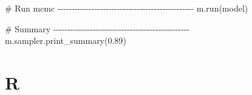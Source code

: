 \documentclass[
  letterpaper,
  DIV=11,
  numbers=noendperiod]{scrreprt}
\newenvironment{Shaded}{\begin{snugshade}}{\end{snugshade}}
\newcommand{\AttributeTok}[1]{\textcolor[rgb]{0.40,0.45,0.13}{#1}}
\newcommand{\CommentTok}[1]{\textcolor[rgb]{0.37,0.37,0.37}{#1}}
\newcommand{\FloatTok}[1]{\textcolor[rgb]{0.68,0.00,0.00}{#1}}
\newcommand{\FunctionTok}[1]{\textcolor[rgb]{0.28,0.35,0.67}{#1}}
\newcommand{\NormalTok}[1]{\textcolor[rgb]{0.00,0.23,0.31}{#1}}
\newcommand{\OtherTok}[1]{\textcolor[rgb]{0.00,0.23,0.31}{#1}}
\newcommand{\SpecialCharTok}[1]{\textcolor[rgb]{0.37,0.37,0.37}{#1}}
\newcommand{\StringTok}[1]{\textcolor[rgb]{0.13,0.47,0.30}{#1}}
\begin{document}
\begin{Shaded}
\begin{Highlighting}[]
\CommentTok{\# Run mcmc {-}{-}{-}{-}{-}{-}{-}{-}{-}{-}{-}{-}{-}{-}{-}{-}{-}{-}{-}{-}{-}{-}{-}{-}{-}{-}{-}{-}{-}{-}{-}{-}{-}{-}{-}{-}{-}{-}{-}{-}{-}{-}{-}{-}{-}{-}{-}{-}}
\NormalTok{m.run(model) }

\CommentTok{\# Summary {-}{-}{-}{-}{-}{-}{-}{-}{-}{-}{-}{-}{-}{-}{-}{-}{-}{-}{-}{-}{-}{-}{-}{-}{-}{-}{-}{-}{-}{-}{-}{-}{-}{-}{-}{-}{-}{-}{-}{-}{-}{-}{-}{-}{-}{-}{-}{-}}
\NormalTok{m.sampler.print\_summary(}\FloatTok{0.89}\NormalTok{)}
\end{Highlighting}
\end{Shaded}

\section{R}

\begin{Shaded}
\end{Shaded}
\end{document}

